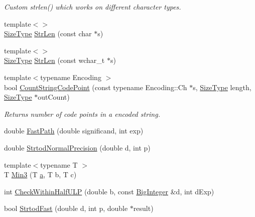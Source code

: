 \begin{DoxyCompactItemize}
\begin{DoxyCompactList}\small\item\em Custom strlen() which works on different character types. \end{DoxyCompactList}\item 
{\footnotesize template$<$$>$ }\\\mbox{\hyperlink{namespacerapidjson_a44eb33eaa523e36d466b1ced64b85c84}{Size\+Type}} \mbox{\hyperlink{namespacerapidjson_1_1internal_a48318b28376546f0bcf0c26e82f45cae}{Str\+Len}} (const char $\ast$s)
\item 
{\footnotesize template$<$$>$ }\\\mbox{\hyperlink{namespacerapidjson_a44eb33eaa523e36d466b1ced64b85c84}{Size\+Type}} \mbox{\hyperlink{namespacerapidjson_1_1internal_ae74a003a7f30195697381e82a63111fb}{Str\+Len}} (const wchar\+\_\+t $\ast$s)
\item 
{\footnotesize template$<$typename Encoding $>$ }\\bool \mbox{\hyperlink{namespacerapidjson_1_1internal_a39c9bac195cb1af11c9f493ef4dca436}{Count\+String\+Code\+Point}} (const typename Encoding\+::\+Ch $\ast$s, \mbox{\hyperlink{namespacerapidjson_a44eb33eaa523e36d466b1ced64b85c84}{Size\+Type}} length, \mbox{\hyperlink{namespacerapidjson_a44eb33eaa523e36d466b1ced64b85c84}{Size\+Type}} $\ast$out\+Count)
\begin{DoxyCompactList}\small\item\em Returns number of code points in a encoded string. \end{DoxyCompactList}\item 
double \mbox{\hyperlink{namespacerapidjson_1_1internal_aadfc08b386baffa85f618e0ef0e2f188}{Fast\+Path}} (double significand, int exp)
\item 
double \mbox{\hyperlink{namespacerapidjson_1_1internal_a0173579d8f2b3724583f64758beb8e69}{Strtod\+Normal\+Precision}} (double d, int p)
\item 
{\footnotesize template$<$typename T $>$ }\\T \mbox{\hyperlink{namespacerapidjson_1_1internal_a7d72423e8173159a0d90cac2f2ef6b8a}{Min3}} (T \mbox{\hyperlink{namespacerapidjson_a11fce64e721729aaf6be4a485c78f231}{a}}, T b, T c)
\item 
int \mbox{\hyperlink{namespacerapidjson_1_1internal_a1c9faaa8ff1461a84ee35c04c7b926c5}{Check\+Within\+Half\+U\+LP}} (double b, const \mbox{\hyperlink{classrapidjson_1_1internal_1_1_big_integer}{Big\+Integer}} \&d, int d\+Exp)
\item 
bool \mbox{\hyperlink{namespacerapidjson_1_1internal_acfd06fe2a2709ad372a373f0921e9571}{Strtod\+Fast}} (double d, int p, double $\ast$result)

\end{DoxyCompactItemize}
